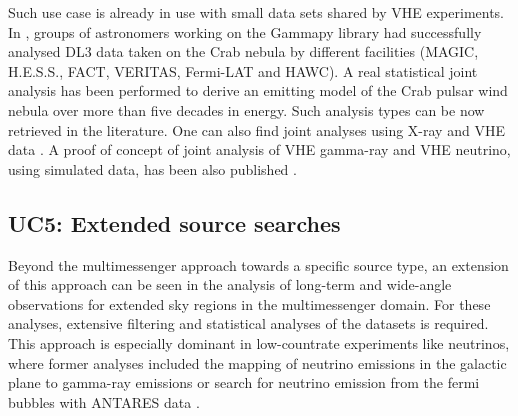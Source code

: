 \documentclass[11pt,a4paper]{ivoa}
\begin{document}
{Such use case is already in use with small data sets shared by VHE experiments. In
\citep{2019A&A...625A..10N, 2022A&A...667A..36A}, groups of astronomers working on the Gammapy library had successfully
analysed DL3 data taken on the Crab nebula by different facilities (MAGIC, H.E.S.S., FACT, VERITAS, Fermi-LAT and HAWC).
A real statistical joint analysis has been performed to derive an emitting model of the Crab pulsar wind nebula over more
than five decades in energy. Such analysis types can be now retrieved in the literature. One can also find joint analyses using X-ray and VHE data \citep{giunti2022}. A proof of concept of joint analysis of VHE gamma-ray and VHE neutrino,
using simulated data, has been also published \citep{unbehaun2024}.

\subsection{UC5: Extended source searches}

Beyond the multimessenger approach towards a specific source type, an extension of this approach can be seen in the analysis
of long-term and wide-angle observations for extended sky regions in the multimessenger domain. For these analyses, extensive filtering
and statistical analyses of the datasets is required. This approach is especially dominant in low-countrate experiments like neutrinos,
where former analyses included the mapping of neutrino emissions in the galactic plane to gamma-ray emissions \citep{doi:10.1126/science.adc9818}
or search for neutrino emission from the fermi bubbles with ANTARES data \citep{ANTARES2014}.


}
\end{document}
